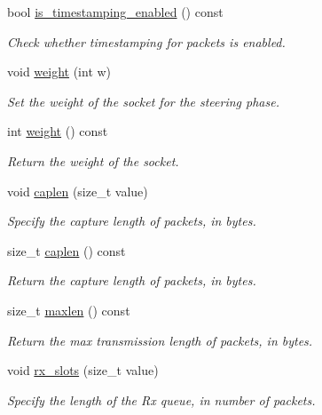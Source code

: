 \begin{DoxyCompactItemize}
bool \hyperlink{classpfq_1_1socket_acb406c77d80eddec6acce34b934a8309}{is\+\_\+timestamping\+\_\+enabled} () const
\begin{DoxyCompactList}\small\item\em Check whether timestamping for packets is enabled. \end{DoxyCompactList}\item 
void \hyperlink{classpfq_1_1socket_ad843f3354b92083f01be9b5055f211b8}{weight} (int w)
\begin{DoxyCompactList}\small\item\em Set the weight of the socket for the steering phase. \end{DoxyCompactList}\item 
int \hyperlink{classpfq_1_1socket_a8c596af298aaae176a64647ba04f51ff}{weight} () const
\begin{DoxyCompactList}\small\item\em Return the weight of the socket. \end{DoxyCompactList}\item 
void \hyperlink{classpfq_1_1socket_ab68dbba5ef01041b9c96758c4a9f0a6c}{caplen} (size\+\_\+t value)
\begin{DoxyCompactList}\small\item\em Specify the capture length of packets, in bytes. \end{DoxyCompactList}\item 
size\+\_\+t \hyperlink{classpfq_1_1socket_aa0052a8337748212d02fadb229d71108}{caplen} () const
\begin{DoxyCompactList}\small\item\em Return the capture length of packets, in bytes. \end{DoxyCompactList}\item 
size\+\_\+t \hyperlink{classpfq_1_1socket_ad2dd981ceb46a6b38caab3cf821e6d46}{maxlen} () const
\begin{DoxyCompactList}\small\item\em Return the max transmission length of packets, in bytes. \end{DoxyCompactList}\item 
void \hyperlink{classpfq_1_1socket_a5cf700fc12d67b91df3d669ac4aa737a}{rx\+\_\+slots} (size\+\_\+t value)
\begin{DoxyCompactList}\small\item\em Specify the length of the Rx queue, in number of packets. \end{DoxyCompactList}\item 

\end{DoxyCompactItemize}
